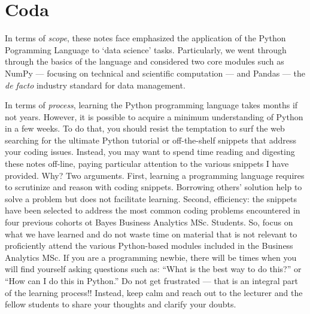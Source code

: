 \documentclass[a4paper,11pt]{book}
\numberwithin{figure}{chapter}
\numberwithin{table}{chapter}
\begin{document}
\clearpage

\theendnotes

\chapter{Coda}

In terms of \textit{scope}, these notes face emphasized the application of the Python Pogramming Language to `data science' tasks. Particularly, we went through through the basics of the language and considered two core modules such as NumPy --- focusing on technical and scientific computation --- and Pandas --- the \textit{de facto} industry standard for data management.

\quad In terms of \textit{process}, learning the Python programming language takes months if not years. However, it is possible to acquire a minimum understanding of Python in a few weeks. To do that, you should resist the temptation to surf the web searching for the ultimate Python tutorial or off-the-shelf snippets that address your coding issues. Instead, you may want to spend time reading and digesting these notes off-line, paying particular attention to the various snippets I have provided. Why? Two arguments. First, learning a programming language requires to scrutinize and reason with coding snippets. Borrowing others' solution help to solve a problem but does not facilitate learning. Second, efficiency: the snippets have been selected to address the most common coding problems encountered in four previous cohorts ot Bayes Business Analytics MSc. Students. So, focus on what we have learned and do not waste time on material that is not relevant to proficiently attend the various Python-based modules included in the Business Analytics MSc. If you are a programming newbie, there will be times when you will find yourself asking questions such as: ``What is the best way to do this?'' or ``How can I do this in Python.'' Do not get frustrated --- that is an integral part of the learning process!! Instead, keep calm and reach out to the lecturer and the fellow students to share your thoughts and clarify your doubts.
\clearpage
\end{document}
